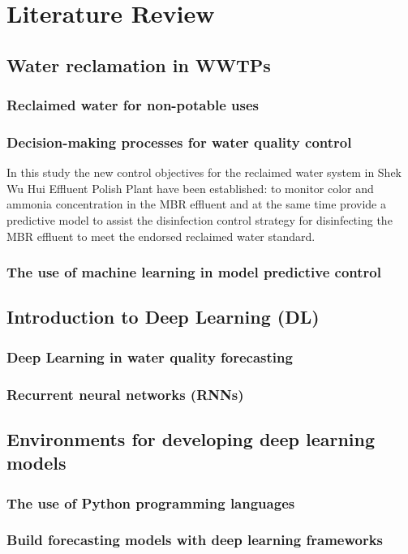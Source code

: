 \chapter{Literature Review}

\section{Water reclamation in WWTPs}
\subsection{Reclaimed water for non-potable uses}

\subsection{Decision-making processes for water quality control}

In this study the new control objectives for the reclaimed water system in 
Shek Wu Hui Effluent Polish Plant have been established: to monitor color 
and ammonia concentration in the MBR effluent and at the same time provide 
a predictive model to assist the disinfection control strategy for disinfecting 
the MBR effluent to meet the endorsed reclaimed water standard.


\subsection{The use of machine learning in model predictive control}


\section{Introduction to Deep Learning (DL)}
\subsection{Deep Learning in water quality forecasting}
\subsection{Recurrent neural networks (RNNs)}

\section{Environments for developing deep learning models}
\subsection{The use of Python programming languages}
\subsection{Build forecasting models with deep learning frameworks}

